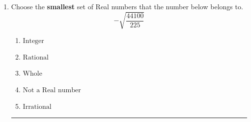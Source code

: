 \documentclass[14pt]{extbook}
\newcommand{\litem}[1]{\item#1\hspace*{-1cm}\rule{\textwidth}{0.4pt}}
\begin{document}
\begin{enumerate}
{\begin{enumerate}[label=\Alph*.]
\end{enumerate} }
\litem{
Choose the \textbf{smallest} set of Real numbers that the number below belongs to.\[ -\sqrt{\frac{44100}{225}} \]\begin{enumerate}[label=\Alph*.]
\item \( \text{Integer} \)
\item \( \text{Rational} \)
\item \( \text{Whole} \)
\item \( \text{Not a Real number} \)
\item \( \text{Irrational} \)

\end{enumerate} }
\end{enumerate}
\end{document}
